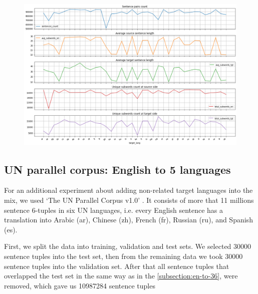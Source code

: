 \begin{figure}[h]
	\centering
	\includegraphics[width=1.0\columnwidth]{img/train_set_statistics.png}
	\label{fig:language_statistics}
\end{figure}



\subsection{{UN parallel corpus: English to 5 languages}}
\label{subsection:en-to-5}

For an additional experiment about adding non-related target languages
into the mix, we used `The UN Parallel Corpus v1.0'
.
It consists of more that 11 millions sentence 6-tuples in six UN languages,
i.e. every English sentence has a translation into Arabic (ar), Chinese (zh),
French (fr), Russian (ru), and Spanish (es).

First, we split the data into training, validation and test sets.
We selected 30000 sentence tuples into the test set, then from the remaining
data we took 30000 sentence tuples into the validation set.
After that all sentence tuples that overlapped the test set in the same way as in the \cref{subsection:en-to-36},  were removed, which gave us 10987284 sentence tuples

